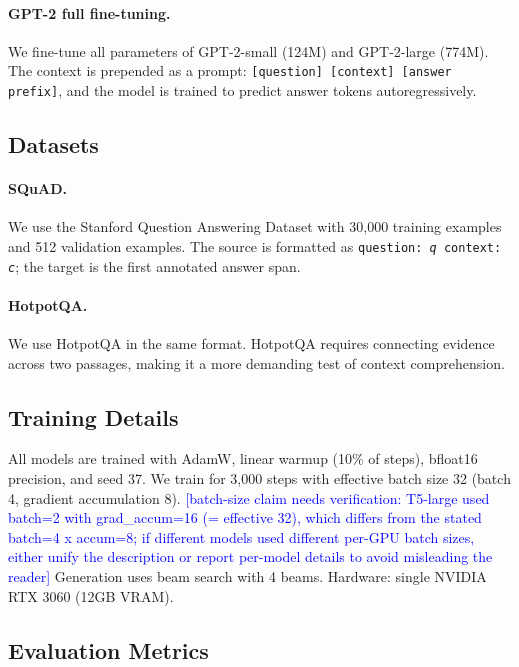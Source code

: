 \documentclass[11pt]{article}
\newcommand{\techcheck}[1]{\textcolor{blue}{[#1]}}
\newcommand{\hotpotqa}{HotpotQA\xspace}
\begin{document}
\paragraph{GPT-2 full fine-tuning.}
We fine-tune all parameters of GPT-2-small (124M) and GPT-2-large (774M).
The context is prepended as a prompt: \texttt{[question] [context] [answer prefix]},
and the model is trained to predict answer tokens autoregressively.

\subsection{Datasets}

\paragraph{SQuAD.}
We use the Stanford Question Answering Dataset \citep{rajpurkar2016squad}
with 30{,}000 training examples and 512 validation examples.
The source is formatted as \texttt{question: \textit{q} context: \textit{c}};
the target is the first annotated answer span.

\paragraph{HotpotQA.}
We use \hotpotqa \citep{yang2018hotpotqa} in the same format.
HotpotQA requires connecting evidence across two passages,
making it a more demanding test of context comprehension.

\subsection{Training Details}

All models are trained with AdamW, linear warmup (10\% of steps),
bfloat16 precision, and seed 37.
We train for 3{,}000 steps with effective batch size 32 (batch 4,
gradient accumulation 8).
\techcheck{batch-size claim needs verification: T5-large used batch=2 with grad\_accum=16 (= effective 32), which differs from the stated batch=4 x accum=8; if different models used different per-GPU batch sizes, either unify the description or report per-model details to avoid misleading the reader}
Generation uses beam search with 4 beams.
Hardware: single NVIDIA RTX 3060 (12GB VRAM).

\subsection{Evaluation Metrics}
\end{document}
